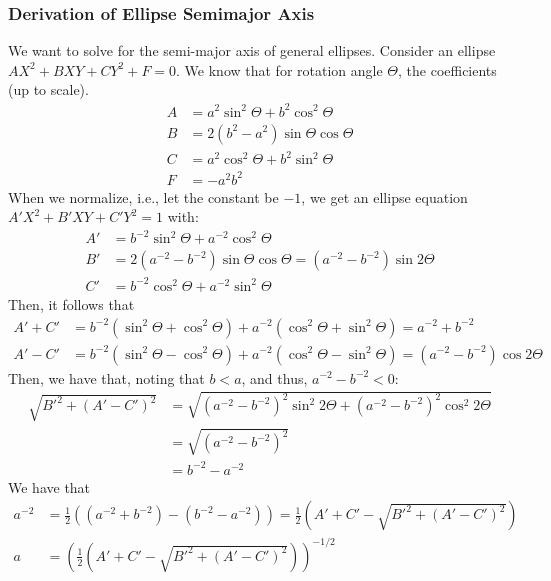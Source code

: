 \documentclass[11pt]{article}
\begin{document}
\subsubsection{Derivation of Ellipse Semimajor Axis}

We want to solve for the semi-major axis of general ellipses.
Consider an ellipse $AX^2 + BXY + CY^2 + F= 0$. We know that for rotation angle $\Theta$,
the coefficients (up to scale).
\begin{align*}
A &= a^2 \sin^2 \Theta + b^2 \cos^2 \Theta \\
B &= 2(b^2 - a^2) \sin \Theta \cos \Theta \\
C &= a^2 \cos^2 \Theta + b^2 \sin^2 \Theta \\
F &= -a^2 b^2
\end{align*}
When we normalize, i.e., let the constant be $-1$, we get an ellipse equation
$A' X^2 + B' XY + C' Y^2 = 1$ with:
\begin{align*}
A' &= b^{-2} \sin^2 \Theta + a^{-2} \cos^2 \Theta \\
B' &= 2\left(a^{-2} - b^{-2}\right) \sin \Theta \cos \Theta = \left(a^{-2} - b^{-2}\right) \sin 2\Theta\\
C' &= b^{-2} \cos^2 \Theta + a^{-2} \sin^2 \Theta
\end{align*}
Then, it follows that 
\begin{align*}
A' + C' &= b^{-2} (\sin^2 \Theta + \cos^2\Theta) + a^{-2} (\cos^2 \Theta + \sin^2\Theta) = a^{-2} + b^{-2} \\
A' - C' &= b^{-2} (\sin^2 \Theta - \cos^2 \Theta) + a^{-2} (\cos^2 \Theta - \sin^2 \Theta) = \left(a^{-2} - b^{-2}\right) \cos 2 \Theta
\end{align*}
Then, we have that, noting that $b < a$, and thus, $a^{-2} - b^{-2} < 0$:
\begin{align*}
\sqrt{B'^2 + (A'- C')^2} &= \sqrt{\left(a^{-2} - b^{-2}\right)^2 \sin^2 2 \Theta + \left(a^{-2} - b^{-2}\right)^2 \cos^2 2\Theta} \\
&= \sqrt{\left(a^{-2} - b^{-2}\right)^2} \\
&= b^{-2} - a^{-2}
\end{align*}
We have that
\begin{align*}
a^{-2} &= \frac{1}{2}\left(\left(a^{-2} + b^{-2}\right) - \left(b^{-2} - a^{-2}\right)\right) =  \frac{1}{2}\left(A' + C' - \sqrt{B'^2 + (A' - C')^2}\right) \\
a &= \left(\frac{1}{2}\left(A' + C' - \sqrt{B'^2 + (A' - C')^2}\right)\right)^{-1/2}
\end{align*}
\end{document}
